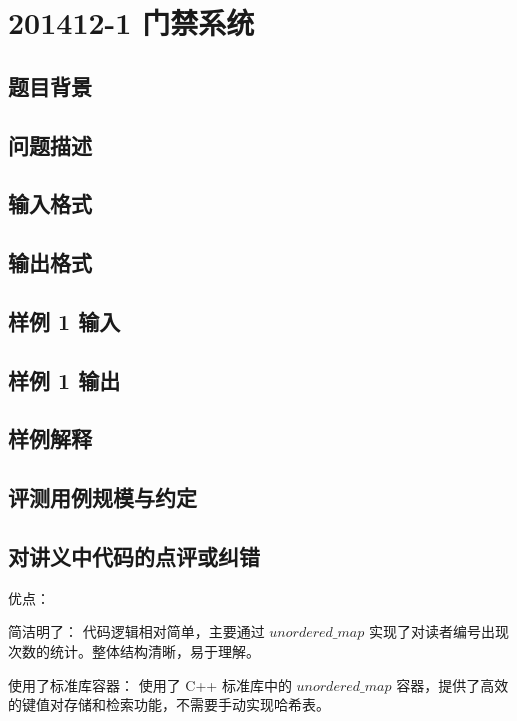\section{201412-1 门禁系统}

\subsection{题目背景}

\subsection{问题描述}

\subsection{输入格式}

\subsection{输出格式}

\subsection{样例 1 输入}

\subsection{样例 1 输出}

\subsection{样例解释}

\subsection{评测用例规模与约定}

\subsection{对讲义中代码的点评或纠错}
 
优点：

简洁明了： 代码逻辑相对简单，主要通过 $unordered\_map$ 实现了对读者编号出现次数的统计。整体结构清晰，易于理解。

使用了标准库容器： 使用了 C++ 标准库中的 $unordered\_map$ 容器，提供了高效的键值对存储和检索功能，不需要手动实现哈希表。


